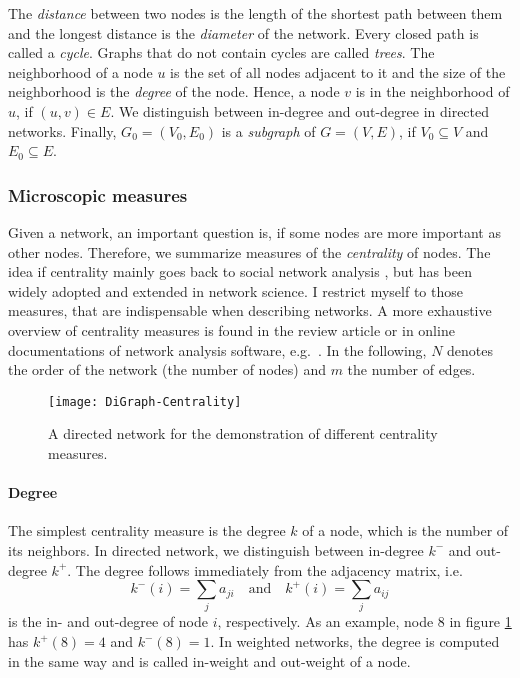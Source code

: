 \documentclass[openright,twoside,headsepline]{scrbook}
\begin{document}
The \emph{distance} between two nodes is the length of the shortest path between them and the longest distance is the \emph{diameter} of the network.
Every closed path is called a \emph{cycle}.
Graphs that do not contain cycles are called \emph{trees}.
The neighborhood of a node $u$ is the set of all nodes adjacent to it and the size of the neighborhood is the \emph{degree} of the node.
Hence, a node $v$ is in the neighborhood of $u$, if $(u,v) \in E$.
We distinguish between in-degree and out-degree in directed networks.
Finally, $G_0=(V_0,E_0)$ is a \emph{subgraph} of $G=(V,E)$, if $V_0 \subseteq V$ and $E_0 \subseteq E$.


\subsubsection{Microscopic measures}\label{sec:micro_measures}
Given a network, an important question is, if some nodes are more important as other nodes.
Therefore, we summarize measures of the \emph{centrality} of nodes.
The idea if centrality mainly goes back to social network analysis \citep{WassermanFaust,Freeman}, but has been widely adopted and extended in network science.
I restrict myself to those measures, that are indispensable when describing networks.
A more exhaustive overview of centrality measures is found in the review article \citep{MartinezLopez2009} or in online documentations of network analysis software, e.g.~\citep{hagberg2008,networkx:}.
In the following, $N$ denotes the order of the network (the number of nodes) and $m$ the number of edges.
%
\begin{figure}[htbp]
\begin{center}
\texttt{[image: DiGraph-Centrality]}
\caption{A directed network for the demonstration of different centrality measures.}
\label{fig:example_net}
\end{center}
\end{figure}
%

\paragraph{Degree\color{Cayenne}{.}}
The simplest centrality measure is the degree $k$ of a node, which is the number of its neighbors.
In directed network, we distinguish between in-degree $k^-$ and out-degree $k^+$.
The degree follows immediately from the adjacency matrix, i.e.
\[
k ^-(i) = \sum _j a_{ji} \quad \text{and} \quad k ^+ (i)= \sum _j a_{ij}
\]
is the in- and out-degree of node $i$, respectively.
As an example, node $8$ in figure \ref{fig:example_net} has $k ^+(8)=4$ and $k ^- (8)=1$.
In weighted networks, the degree is computed in the same way and is called in-weight and out-weight of a node.
\end{document}
